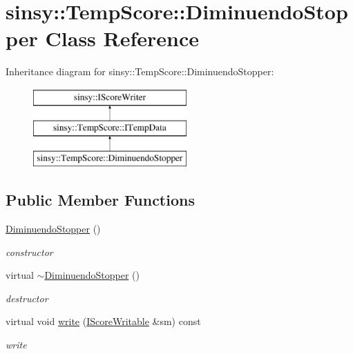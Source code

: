 \hypertarget{classsinsy_1_1TempScore_1_1DiminuendoStopper}{\section{sinsy\-:\-:\-Temp\-Score\-:\-:\-Diminuendo\-Stopper \-Class \-Reference}
\label{classsinsy_1_1TempScore_1_1DiminuendoStopper}
}
\-Inheritance diagram for sinsy\-:\-:\-Temp\-Score\-:\-:\-Diminuendo\-Stopper\-:\begin{figure}[H]
\begin{center}
\leavevmode
\includegraphics[height=3.000000cm]{classsinsy_1_1TempScore_1_1DiminuendoStopper}
\end{center}
\end{figure}
\subsection*{\-Public \-Member \-Functions}
\begin{DoxyCompactItemize}
\item 
\hypertarget{classsinsy_1_1TempScore_1_1DiminuendoStopper_ad018ff485c9826001270c12b9a7b3d31}{\hyperlink{classsinsy_1_1TempScore_1_1DiminuendoStopper_ad018ff485c9826001270c12b9a7b3d31}{\-Diminuendo\-Stopper} ()}\label{classsinsy_1_1TempScore_1_1DiminuendoStopper_ad018ff485c9826001270c12b9a7b3d31}

\begin{DoxyCompactList}\small\item\em constructor \end{DoxyCompactList}\item 
\hypertarget{classsinsy_1_1TempScore_1_1DiminuendoStopper_a783373c3255e7b819c9e8a4b52363c1e}{virtual \hyperlink{classsinsy_1_1TempScore_1_1DiminuendoStopper_a783373c3255e7b819c9e8a4b52363c1e}{$\sim$\-Diminuendo\-Stopper} ()}\label{classsinsy_1_1TempScore_1_1DiminuendoStopper_a783373c3255e7b819c9e8a4b52363c1e}

\begin{DoxyCompactList}\small\item\em destructor \end{DoxyCompactList}\item 
\hypertarget{classsinsy_1_1TempScore_1_1DiminuendoStopper_a89abf91b595eb10415fed8cacb1f10eb}{virtual void \hyperlink{classsinsy_1_1TempScore_1_1DiminuendoStopper_a89abf91b595eb10415fed8cacb1f10eb}{write} (\hyperlink{classsinsy_1_1IScoreWritable}{\-I\-Score\-Writable} \&sm) const }\label{classsinsy_1_1TempScore_1_1DiminuendoStopper_a89abf91b595eb10415fed8cacb1f10eb}

\begin{DoxyCompactList}\small\item\em write \end{DoxyCompactList}\end{DoxyCompactItemize}


